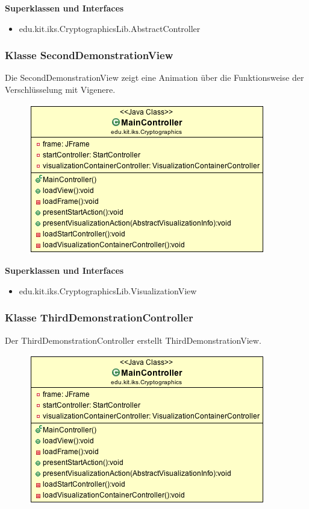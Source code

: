 \documentclass{article}
\begin{document}
      \textbf{Superklassen und Interfaces}
      \begin{itemize}
        \item edu.kit.iks.CryptographicsLib.AbstractController
      \end{itemize}

    \subsubsection{Klasse SecondDemonstrationView}
      Die SecondDemonstrationView zeigt eine Animation über die Funktionsweise der Verschlüsselung mit Vigenere.
      \begin{figure}[H]
        \centering
        \includegraphics[width=\textwidth]{resources/edu-kit-iks-Cryptographics-MainController}
      \end{figure}

      \textbf{Superklassen und Interfaces}
      \begin{itemize}
        \item edu.kit.iks.CryptographicsLib.VisualizationView
      \end{itemize}

    \subsubsection{Klasse ThirdDemonstrationController}
      Der ThirdDemonstrationController erstellt ThirdDemonstrationView.
      \begin{figure}[H]
        \centering
        \includegraphics[width=\textwidth]{resources/edu-kit-iks-Cryptographics-MainController}
      \end{figure}
\end{document}
